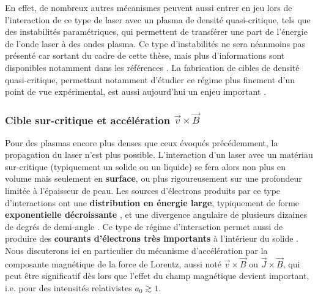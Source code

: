 \begin{refsection}
En effet, de nombreux autres mécanismes peuvent aussi entrer en jeu lors de l'interaction de ce type de laser avec un plasma de densité quasi-critique, tels que des instabilités paramétriques, qui permettent de transférer une part de l'énergie de l'onde laser à des ondes plasma. Ce type d'instabilités ne sera néanmoins pas présenté car sortant du cadre de cette thèse, mais plus d'informations sont disponibles notamment dans les références \parencite{moreau_phd, kruer_2003}. La fabrication de cibles de densité quasi-critique, permettant notamment d'étudier ce régime plus finement d'un point de vue expérimental, est aussi aujourd'hui un enjeu important \parencite{passoni_2020, prencipe_2017}.

\subsubsection{Cible sur-critique et accélération $\vec{v} \times \vec{B}$}

Pour des plasmas encore plus denses que ceux évoqués précédemment, la propagation du laser n'est plus possible. L'interaction d'un laser avec un matériau sur-critique (typiquement un solide ou un liquide) se fera alors non plus en volume mais seulement en \textbf{surface}, ou plus rigoureusement sur une profondeur limitée à l'épaisseur de peau. Les sources d'électrons produits par ce type d'interactions ont une \textbf{distribution en énergie large}, typiquement de forme \textbf{exponentielle décroissante} \parencite{malka_1996}, et une divergence angulaire de plusieurs dizaines de degrés de demi-angle \parencite{debayle_2010}. Ce type de régime d'interaction permet aussi de produire des \textbf{courants d'électrons très importants} à l'intérieur du solide \parencite{macchi_2012}. Nous discuterons ici en particulier du mécanisme d'accélération par la composante magnétique de la force de Lorentz, aussi noté $\vec{v} \times \vec{B}$ ou $\vec{J} \times \vec{B}$, qui peut être significatif dès lors que l'effet du champ magnétique devient important, i.e. pour des intensités relativistes $a_0 \gtrsim 1$. 


\end{refsection}
